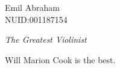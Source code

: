 \documentclass[12pt]{article}
\begin{document}
 \noindent Emil Abraham\\ NUID:001187154\\

\centerline{\emph{The Greatest Violinist}}

\doublespacing Will Marion Cook is the best.
\end{document}
